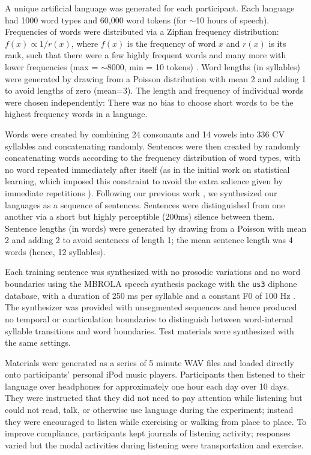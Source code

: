 \documentclass[10pt]{article}
\begin{document}
A unique artificial language was generated for each participant. Each language had 1000 word types and 60,000 word tokens (for $\sim$10 hours of speech). Frequencies of words were distributed via a Zipfian frequency distribution: $f(x) \propto 1 / r(x)$, where $f(x)$ is the frequency of word $x$ and $r(x)$ is its rank, such that there were a few highly frequent words and many more with lower frequencies (max = $\sim$8000, min = 10 tokens) \cite{zipf1965}. Word lengths (in syllables) were generated by drawing from a Poisson distribution with mean 2 and adding 1 to avoid lengths of zero (mean=3). The length and frequency of individual words were chosen independently: There was no bias to choose short words to be the highest frequency words in a language.

Words were created by combining 24 consonants and 14 vowels into 336 CV syllables and concatenating randomly. Sentences were then created by randomly concatenating words according to the frequency distribution of word types, with no word repeated immediately after itself (as in the initial work on statistical learning, which imposed this constraint to avoid the extra salience given by immediate repetitions \cite{saffran1996a,saffran1996b}). Following our previous work \cite{frank2010,kurumada2011}, we synthesized our languages as a sequence of sentences. Sentences were distinguished from one another via a short but highly perceptible (200ms) silence between them. Sentence lengths (in words) were generated by drawing from a Poisson with mean 2 and adding 2 to avoid sentences of length 1; the mean sentence length was 4 words (hence, 12 syllables). 

Each training sentence was synthesized with no prosodic variations and no word boundaries using the MBROLA speech synthesis package with the \texttt{us3} diphone database, with a duration of 250 ms per syllable and a constant F0 of 100 Hz \cite{dutoit1996}. The synthesizer was provided with unsegmented sequences and hence produced no temporal or coarticulation boundaries to distinguish between word-internal syllable transitions and word boundaries. Test materials were synthesized with the same settings. 

Materials were generated as a series of 5 minute WAV files and loaded directly onto participants' personal iPod music players. Participants then listened to their language over headphones for approximately one hour each day over 10 days. They were instructed that they did not need to pay attention while listening but could not read, talk, or otherwise use language during the experiment; instead they were encouraged to listen while exercising or walking from place to place. To improve compliance, participants kept journals of listening activity; responses varied but the modal activities during listening were transportation and exercise. 
\end{document}
